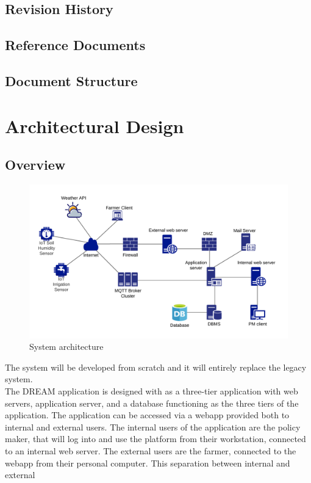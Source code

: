 \documentclass[10pt]{article} %
\begin{document}
\subsection{Revision History}
\subsection{Reference Documents}
\subsection{Document Structure}
\section{Architectural Design}
\subsection{Overview}
\begin{figure}[h]
    \centering
    \centerline{\includegraphics[scale=0.9]{images/overview_architecture.png}}
    \caption{System architecture}
    \label{fig:overview}
\end{figure}
The system will be developed from scratch and it will entirely replace the legacy system.\\
The DREAM application is designed with as a three-tier application with web servers, application server, and a database functioning as the three tiers of the application.
The application can be accessed via a webapp provided both to internal and external users. The internal users of the application are the policy maker, that will log into and use the platform
from their workstation, connected to an internal web server. The external users are the farmer, connected to the webapp from their personal computer. This separation between internal and external 
\end{document}
